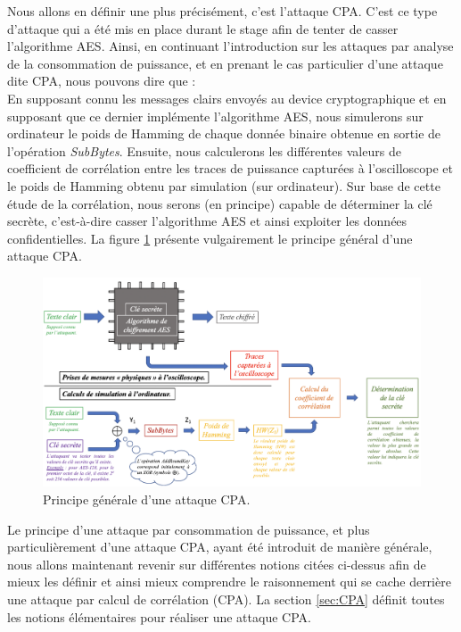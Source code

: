\documentclass[10pt, oneside, a4paper]{article}
\begin{document}
\hspace{-0.5 cm}Nous allons en définir une plus précisément, c'est l'attaque CPA. C'est ce type d'attaque qui a été mis en place durant le stage afin de tenter de casser l'algorithme AES. Ainsi, en continuant l'introduction sur les attaques par analyse de la consommation de puissance, et en prenant le cas particulier d'une attaque dite CPA, nous pouvons dire que : \\ En supposant connu les messages clairs envoyés au device cryptographique et en supposant que ce dernier implémente l'algorithme AES, nous simulerons sur ordinateur le poids de Hamming de chaque donnée binaire obtenue en sortie de l'opération \textit{SubBytes}. Ensuite, nous calculerons les différentes valeurs de coefficient de corrélation entre les traces de puissance capturées à l'oscilloscope et le poids de Hamming obtenu par simulation (sur ordinateur). Sur base de cette étude de la corrélation, nous serons (en principe) capable de déterminer la clé secrète, c'est-à-dire casser l'algorithme AES et ainsi exploiter les données confidentielles. La figure \ref{fig:CPA} présente vulgairement le principe général d'une attaque CPA.
\begin{figure}[h]
    \hspace{-1.5 cm}
    \includegraphics[scale=0.73]{image/CPA}
    \caption{Principe générale d'une attaque CPA.}
    \label{fig:CPA} 
\end{figure}

\vspace{-0.3 cm}Le principe d'une attaque par consommation de puissance, et plus particulièrement d'une attaque CPA, ayant été introduit de manière générale, nous allons maintenant revenir sur différentes notions citées ci-dessus afin de mieux les définir et ainsi mieux comprendre le raisonnement qui se cache derrière une attaque par calcul de corrélation (CPA). La section \ref{sec:CPA} définit toutes les notions élémentaires pour réaliser une attaque CPA.
\end{document}
